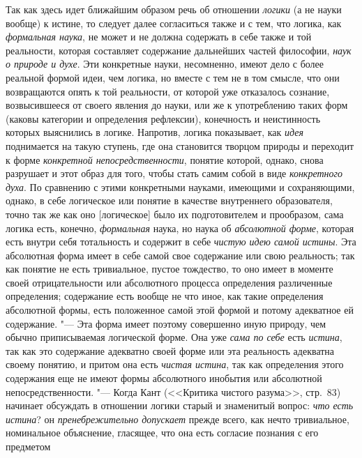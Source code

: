 {Так как здесь идет ближайшим образом речь об отношении
{\em логики} (а не науки
вообще) к истине, то следует далее согласиться также и с тем, что логика,
как {\em формальная наука},
не может и не должна содержать в себе также и той реальности,
которая составляет содержание дальнейших частей философии,
{\em наук о природе и духе}.
Эти конкретные науки, несомненно, имеют дело с более реальной
формой идеи, чем логика, но вместе с тем не в том смысле, что они
возвращаются опять к той реальности, от которой уже отказалось сознание,
возвысившееся от своего явления до науки, или же к употреблению таких форм
(каковы категории и определения рефлексии), конечность и неистинность
которых выяснились в логике. Напротив, логика показывает, как
{\em идея} поднимается на
такую ступень, где она становится творцом природы и переходит к форме
{\em конкретной непосредственности},
понятие которой, однако, снова разрушает и этот образ для
того, чтобы стать самим собой в виде
{\em конкретного духа}.
По сравнению с этими конкретными науками, имеющими и
сохраняющими, однако, в себе логическое или понятие в качестве внутреннего
образователя, точно так же как оно [логическое] было их подготовителем и
прообразом, сама логика есть, конечно,
{\em формальная} наука,
но наука об {\em абсолютной форме},
которая есть внутри себя тотальность и содержит в себе
{\em чистую идею самой истины}.
Эта абсолютная форма имеет в себе самой свое содержание или
свою реальность; так как понятие не есть тривиальное, пустое тождество, то
оно имеет в моменте своей отрицательности или абсолютного процесса
определения различенные определения; содержание есть вообще не что иное,
как такие определения абсолютной формы, есть положенное самой этой формой и
потому адекватное ей содержание. "--- Эта форма имеет поэтому
совершенно иную природу, чем обычно приписываемая логической
форме. Она уже {\em сама по себе}
есть {\em истина},
так как это содержание адекватно своей форме или эта
реальность адекватна своему понятию, и притом она есть
{\em чистая истина}, так
как определения этого содержания еще не имеют формы абсолютного инобытия
или абсолютной непосредственности. "--- Когда Кант (<<Критика
чистого разума>>, стр.~83) начинает обсуждать в отношении логики старый и
знаменитый вопрос: {\em что есть
истина}? он
{\em пренебрежительно допускает
}прежде всего, как нечто тривиальное, номинальное
объяснение, гласящее, что она есть согласие познания с его
предметом}
